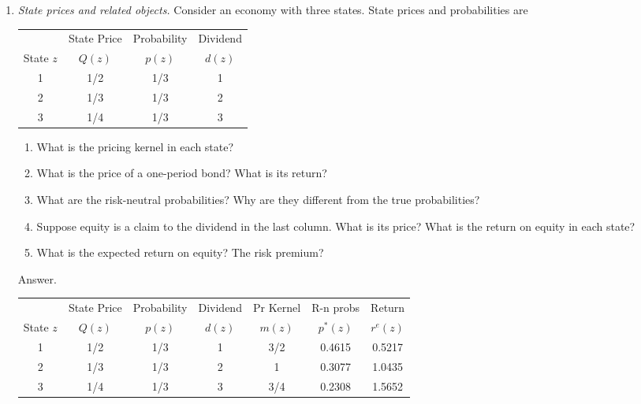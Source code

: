 \documentclass[11pt]{article}
\begin{document}
\begin{enumerate}
\item {\it State prices and related objects.\/}
Consider an economy with three states.
State prices and probabilities are

\begin{center}
\begin{tabular}{cccc}
\toprule
        & State Price   & Probability &  Dividend  \\
State $z$  &  $Q(z)$    & $p(z)$      &   $d(z)$   \\
\midrule
1       & 1/2 & 1/3 & 1 \\
2       & 1/3 & 1/3 & 2 \\
3       & 1/4 & 1/3 & 3 \\
\bottomrule
\end{tabular}
\end{center}

\smallskip
\begin{enumerate}
\item What is the pricing kernel in each state?
\item What is the price of a one-period bond?  What is its return?
\item What are the risk-neutral probabilities?
Why are they different from the true probabilities?
\item Suppose equity is a claim to the dividend in the last column.
What is its price? What is the return on equity in each state?
\item What is the expected return on equity?
The risk premium?
\end{enumerate}

Answer.
\begin{center}
\begin{tabular}{ccccccc}
\toprule
        & State Price   & Probability &  Dividend & Pr Kernel & R-n probs & Return \\
State $z$  &  $Q(z)$    & $p(z)$      &   $d(z)$  &  $m(z)$   &  $p^*(z)$ & $r^e(z)$ \\
\midrule
1       & 1/2 & 1/3 & 1 & 3/2 & 0.4615 & 0.5217 \\
2       & 1/3 & 1/3 & 2 &  1  & 0.3077 & 1.0435 \\
3       & 1/4 & 1/3 & 3 &  3/4& 0.2308 & 1.5652 \\
\bottomrule
\end{tabular}
\end{center}


\end{enumerate}
\end{document}
